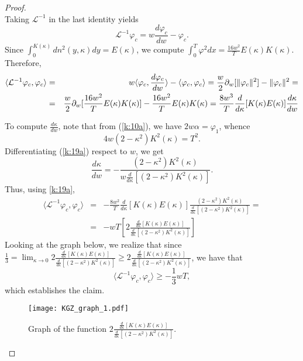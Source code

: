 \documentclass[final,11pt,leqno]{amsart}
\begin{document}
\begin{proof}
$$    $$
Taking ${\mathcal L}^{-1}$ in the last identity yields
    $$
    {\mathcal L}^{-1}{\varphi}_c=w{\frac{d{\varphi}_c}{dw}}-{\varphi}_c.
    $$
Since   $\int_{0}^{K(\kappa)}{dn^2(y,\kappa)}dy=E(\kappa)$, we compute $\int_{0}^{T}{{\varphi}^2}dx=\frac{16w^2}{T} E(\kappa)K(\kappa)$.
    Therefore,
     \begin{eqnarray*}
         \langle {\mathcal L}^{-1}{\varphi}_c, {\varphi}_c\rangle &=& w\langle {\varphi}_c, {\frac{d{\varphi}_c}{dw}}\rangle-\langle {\varphi}_c, {\varphi}_c\rangle={\frac{{w}}{{2}}} {\partial}_w[\|{\varphi}_c\|^2]- \|{\varphi}_c\|^2= \\
         &=&
        {\frac{{w}}{{2}}} {\partial}_w[ \frac{16w^2}{T} E(\kappa)K(\kappa)]-
        \frac{16w^2}{T} E(\kappa)K(\kappa)=\frac{8w^3}{T}}{\frac{d}{d\kappa}}[K(\kappa)E(\kappa)]{\frac{d\kappa}{dw}
          \end{eqnarray*}

To compute $\frac{d\kappa}{dw}$, note that from (\ref{k:10a}), we have  $2w\alpha={\varphi}_1$, whence
              \begin{equation}\label{k:19a}
                4w(2-\kappa^2)K^2(\kappa)=T^2.
              \end{equation}
              Differentiating (\ref{k:19a}) respect to $w$, we
              get
              \begin{equation}\label{k:19b}
                {\frac{d\kappa}{dw}}=-{\frac{(2-\kappa^2)K^2(\kappa)}{w{\frac{d}{d\kappa}}[(2-\kappa^2)K^2(\kappa)]}}.
              \end{equation}
Thus, using \eqref{k:19a},
\begin{eqnarray*}
 \langle {\mathcal L}^{-1}{\varphi}_c, {\varphi}_c\rangle &=&  -\frac{8w^2}{T} \frac{d}{d\kappa}[K(\kappa)E(\kappa)] {\frac{(2-\kappa^2)K^2(\kappa)}{{\frac{d}{d\kappa}}[(2-\kappa^2)K^2(\kappa)]}}= \\
 &=& -w T\left[2 {\frac{{ \frac{d}{d\kappa}[K(\kappa)E(\kappa)] }}{{{\frac{d}{d\kappa}}[(2-\kappa^2)K^2(\kappa)]}}} \right]
\end{eqnarray*}
Looking at the graph below, we realize that since
${\frac{{1}}{{3}}}=\lim_{{\kappa}\to 0} 2 {\frac{{ \frac{d}{d\kappa}[K(\kappa)E(\kappa)] }}{{{\frac{d}{d\kappa}}[(2-\kappa^2)K^2(\kappa)]}}}   \geq 2 {\frac{{ \frac{d}{d\kappa}[K(\kappa)E(\kappa)] }}{{{\frac{d}{d\kappa}}[(2-\kappa^2)K^2(\kappa)]}}}$,  we have that
$$
\langle {\mathcal L}^{-1}{\varphi}_c, {\varphi}_c\rangle\geq -{\frac{{1}}{{3}}} wT,
$$
which establishes the claim.
\begin{figure}[h9]
\centering
\texttt{[image: KGZ\_graph\_1.pdf]}
\caption{Graph of the function
$2 {\frac{{ \frac{d}{d\kappa}[K(\kappa)E(\kappa)] }}{{{\frac{d}{d\kappa}}[(2-\kappa^2)K^2(\kappa)]}}} $.}
\label{fig9}
\end{figure}

\end{proof}
\end{document}
